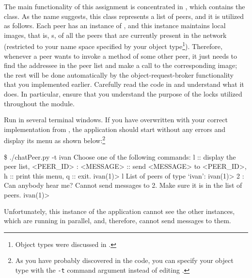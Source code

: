 \documentclass[a4paper]{article}
\begin{document}
The main functionality of this assignment is concentrated in
, which contains the  class. As the
name suggests, this class represents a list of peers, and it is utilized as
follows. Each peer has an instance of , and this instance
maintains local images, that is, s, of all the peers that are
currently present in the network (restricted to your name space specified by
your object type\footnote{Object types were discussed in .}). Therefore,
whenever a peer wants to invoke a method of some other peer, it just needs to
find the addressee in the peer list and make a call to the corresponding image;
the rest will be done automatically by the object-request-broker functionality
that you implemented earlier. Carefully read the code in 
and understand what it does. In particular, ensure that you understand the
purpose of the locks utilized throughout the module.

Run  in several terminal windows. If you have overwritten
 with your correct implementation from , the
application should start without any errors and display its menu as shown
below:\footnote{As you have probably discovered in the code, you can specify
your object type with the \texttt{-t} command argument instead of editing
.}
\begin{shell}
\$ ./chatPeer.py -t ivan
Choose one of the following commands:
    l                       ::  display the peer list,
    <PEER_ID> : <MESSAGE>   ::  send <MESSAGE> to <PEER_ID>,
    h                       ::  print this menu,
    q                       ::  exit.
ivan(1)> l
List of peers of type `ivan':
ivan(1)> 2 : Can anybody hear me?
Cannot send messages to 2. Make sure it is in the list of peers.
ivan(1)>
\end{shell}
Unfortunately, this instance of the application cannot see the other instances,
which are running in parallel, and, therefore, cannot send messages to them.
\end{document}

